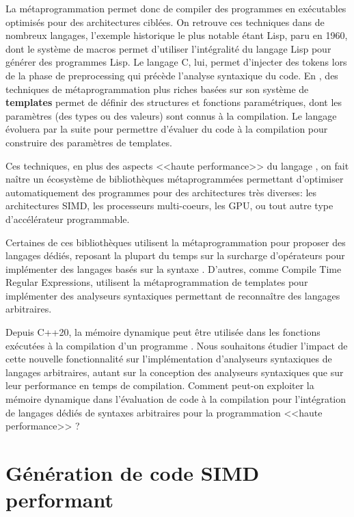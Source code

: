 \documentclass[main]{subfiles}
\begin{document}
La m\'etaprogrammation permet donc de compiler des programmes en ex\'ecutables
optimis\'es pour des architectures cibl\'ees. On retrouve ces techniques
dans de nombreux langages, l'exemple historique le plus notable \'etant
Lisp, paru en 1960, dont le syst\`eme de macros permet d'utiliser
l'int\'egralit\'e du langage Lisp pour g\'en\'erer des programmes Lisp.
Le langage C, lui, permet d'injecter des tokens lors de la phase de
preprocessing qui pr\'ec\`ede l'analyse syntaxique du code. En \cpp,
des techniques de m\'etaprogrammation plus riches bas\'ees sur son syst\`eme de
\textbf{templates} permet de d\'efinir des structures et fonctions
param\'etriques, dont les param\`etres (des types ou des valeurs) sont
connus \`a la compilation. Le langage \'evoluera par la suite pour permettre
d'\'evaluer du code \cpp \`a la compilation pour construire des param\`etres de
templates.

Ces techniques, en plus des aspects <<haute performance>> du langage \cpp,
on fait na\^itre un \'ecosyst\`eme de biblioth\`eques m\'etaprogramm\'ees
permettant d'optimiser automatiquement des programmes pour des architectures
tr\`es diverses: les architectures SIMD, les processeurs multi-coeurs, les GPU,
ou tout autre type d'acc\'el\'erateur programmable.

Certaines de ces biblioth\`eques utilisent la m\'etaprogrammation pour proposer
des langages d\'edi\'es, reposant la plupart du temps sur la surcharge
d'op\'erateurs pour impl\'ementer des langages bas\'es sur la syntaxe \cpp.
D'autres, comme Compile Time Regular Expressions, utilisent
la m\'etaprogrammation de templates pour impl\'ementer des analyseurs
syntaxiques permettant de reconna\^itre des langages arbitraires.

Depuis C++20, la m\'emoire dynamique peut \^etre utilis\'ee dans les fonctions
ex\'ecut\'ees \`a la compilation d'un programme \cpp. Nous souhaitons \'etudier
l'impact de cette nouvelle fonctionnalit\'e sur l'impl\'ementation d'analyseurs
syntaxiques de langages arbitraires, autant sur la conception des analyseurs
syntaxiques que sur leur performance en temps de compilation.
Comment peut-on exploiter la m\'emoire dynamique dans l'\'evaluation de code
\cpp \`a la compilation pour l'int\'egration de langages d\'edi\'es de syntaxes
arbitraires pour la programmation <<haute performance>> ?

\section{
  G\'en\'eration de code SIMD performant
}
\end{document}
